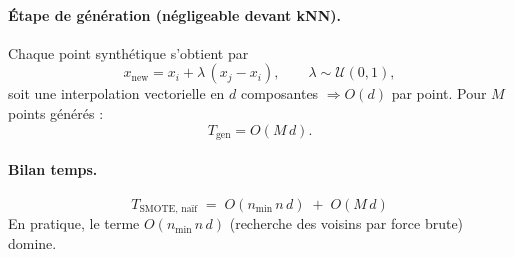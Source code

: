 \documentclass{article}
\begin{document}
\paragraph{Étape de génération (négligeable devant kNN).}
Chaque point synthétique s’obtient par
\[
x_{\text{new}} = x_i + \lambda\,(x_j - x_i), \qquad \lambda\sim\mathcal{U}(0,1),
\]
soit une interpolation vectorielle en $d$ composantes $\Rightarrow O(d)$ par point.
Pour $M$ points générés :
\[
T_{\text{gen}} = O(M\,d).
\]

\paragraph{Bilan temps.}
\[
\boxed{ \; T_{\text{SMOTE, naïf}} \;=\; O(n_{\text{min}}\,n\,d) \;+\; O(M\,d) \;}
\]
En pratique, le terme $O(n_{\text{min}}\,n\,d)$ (recherche des voisins par force brute) domine.

\newpage

\printbibliography
\end{document}
